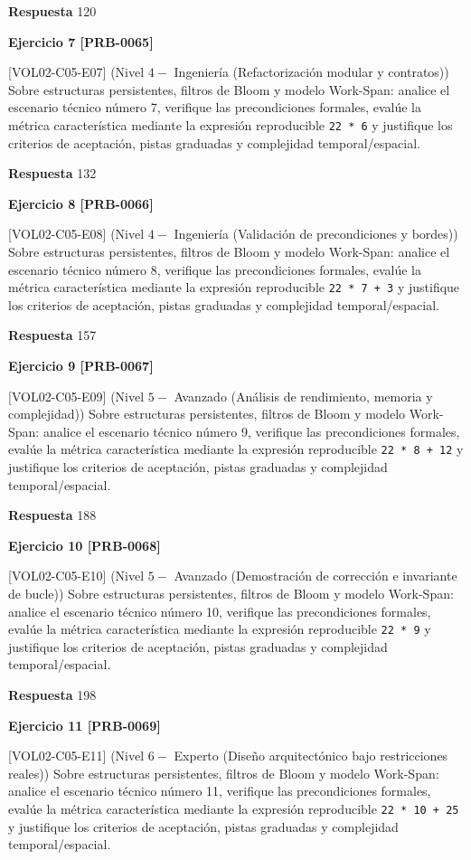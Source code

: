 \documentclass{book}
\begin{document}
\noindent\textbf{Respuesta} 120

\noindent\textbf{Ejercicio 7 [PRB-0065]}

[VOL02-C05-E07] (Nivel \(4 -\) Ingeniería (Refactorización modular y contratos)) Sobre estructuras persistentes, filtros de Bloom y modelo Work-Span: analice el escenario técnico número 7, verifique las precondiciones formales, evalúe la métrica característica mediante la expresión reproducible \texttt{22 * 6} y justifique los criterios de aceptación, pistas graduadas y complejidad temporal/espacial.

\noindent\textbf{Respuesta} 132

\noindent\textbf{Ejercicio 8 [PRB-0066]}

[VOL02-C05-E08] (Nivel \(4 -\) Ingeniería (Validación de precondiciones y bordes)) Sobre estructuras persistentes, filtros de Bloom y modelo Work-Span: analice el escenario técnico número 8, verifique las precondiciones formales, evalúe la métrica característica mediante la expresión reproducible \texttt{22 * 7 + 3} y justifique los criterios de aceptación, pistas graduadas y complejidad temporal/espacial.

\noindent\textbf{Respuesta} 157

\noindent\textbf{Ejercicio 9 [PRB-0067]}

[VOL02-C05-E09] (Nivel \(5 -\) Avanzado (Análisis de rendimiento, memoria y complejidad)) Sobre estructuras persistentes, filtros de Bloom y modelo Work-Span: analice el escenario técnico número 9, verifique las precondiciones formales, evalúe la métrica característica mediante la expresión reproducible \texttt{22 * 8 + 12} y justifique los criterios de aceptación, pistas graduadas y complejidad temporal/espacial.

\noindent\textbf{Respuesta} 188

\noindent\textbf{Ejercicio 10 [PRB-0068]}

[VOL02-C05-E10] (Nivel \(5 -\) Avanzado (Demostración de corrección e invariante de bucle)) Sobre estructuras persistentes, filtros de Bloom y modelo Work-Span: analice el escenario técnico número 10, verifique las precondiciones formales, evalúe la métrica característica mediante la expresión reproducible \texttt{22 * 9} y justifique los criterios de aceptación, pistas graduadas y complejidad temporal/espacial.

\noindent\textbf{Respuesta} 198

\noindent\textbf{Ejercicio 11 [PRB-0069]}

[VOL02-C05-E11] (Nivel \(6 -\) Experto (Diseño arquitectónico bajo restricciones reales)) Sobre estructuras persistentes, filtros de Bloom y modelo Work-Span: analice el escenario técnico número 11, verifique las precondiciones formales, evalúe la métrica característica mediante la expresión reproducible \texttt{22 * 10 + 25} y justifique los criterios de aceptación, pistas graduadas y complejidad temporal/espacial.
\end{document}
